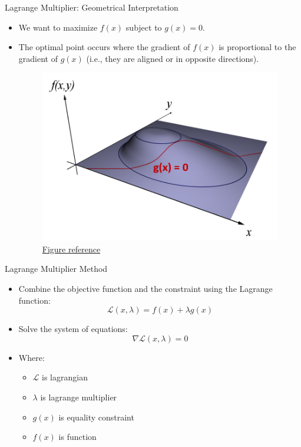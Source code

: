 \documentclass[serif, aspectratio=169]{beamer}
\begin{document}
\begin{frame}{Lagrange Multiplier: Geometrical Interpretation}
    \begin{itemize}
        \item We want to maximize $f(x)$ subject to $g(x) = 0$.
        \item The optimal point occurs where the gradient of $f(x)$ is proportional to the gradient of $g(x)$ (i.e., they are aligned or in opposite directions). 
     \begin{figure}[htpb]
            \begin{center}
         \includegraphics[keepaspectratio, scale=0.4]{pic/lagrange3d.png}
         \caption{\href{https://www.khanacademy.org/math/multivariable-calculus/applications-of-multivariable-derivatives/constrained-optimization/a/lagrange-multipliers-examples}{Figure reference}}
            \end{center}
        \end{figure}
    \end{itemize}
\end{frame}

\begin{frame}{Lagrange Multiplier Method}
    \begin{itemize}
        \item Combine the objective function and the constraint using the Lagrange function:
        $$\mathcal{L}(x, \lambda) = f(x) + \lambda g(x)$$
        \item Solve the system of equations:
        $$\nabla \mathcal{L}(x, \lambda) = 0$$
        \item Where:
        \begin{itemize}
            \item $\mathcal{L}$ is  lagrangian
            \item $\lambda$ is lagrange multiplier
            \item $g(x)$ is equality constraint
            \item $f(x)$ is function
        \end{itemize}
    \end{itemize}
\end{frame}
\end{document}
